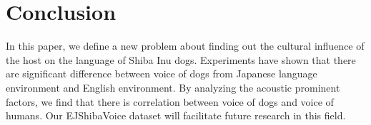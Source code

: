 \section{Conclusion}
In this paper, we define a new problem about finding out the cultural influence of the host on the language of Shiba Inu dogs. Experiments have shown that there are significant difference between voice of dogs from Japanese language environment and English environment. By analyzing the acoustic prominent factors, we find that there is correlation between voice of dogs and voice of humans. Our  EJShibaVoice dataset will facilitate future research in this field.

